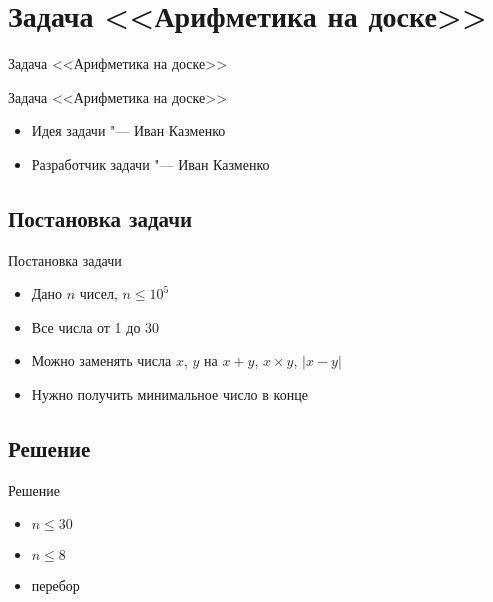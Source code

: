 \section{Задача <<Арифметика на доске>>}

\begin{frame}[t]{Задача <<Арифметика на доске>>}

    \begin{center}
        \LARGE Задача <<Арифметика на доске>>
    \end{center}

    \begin{itemize}
        \item Идея задачи "--- Иван Казменко
        \item Разработчик задачи "--- Иван Казменко
    \end{itemize}
\end{frame}

\subsection{Постановка задачи}

\begin{frame}[t]{Постановка задачи}
    \begin{itemize}
        \item Дано $n$ чисел, $n \le 10^5$
        \item Все числа от 1 до 30
        \item Можно заменять числа $x$, $y$ на $x + y$, $x \times y$, $|x - y|$
        \item Нужно получить минимальное число в конце
    \end{itemize}
\end{frame}

\subsection{Решение}

\begin{frame}[t]{Решение}
    \begin{itemize}
        \item $n \le 30$
        \item $n \le 8$
        \item перебор
    \end{itemize}
\end{frame}
